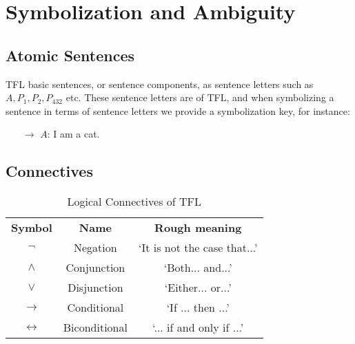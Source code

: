 %
%
%
\chapter{Symbolization and Ambiguity}
\label{Symb} %

\section{ Atomic Sentences}

\begin{definition}
    TFL  basic sentences, or sentence components, as sentence letters such as $A,P_1,P_2,P_{432}$ etc. These sentence letters are  of TFL, and when symbolizing a sentence in terms of sentence letters we provide a symbolization key, for instance:\begin{enumerate}
        \item[$\rightarrow$] $A$: I am a cat.
    \end{enumerate}
\end{definition}

\section{ Connectives}

\begin{table}[H]
    \centering
    \caption{Logical Connectives of TFL}
    \begin{tabular}{ccc}
        \textbf{Symbol} & \textbf{Name} & \textbf{Rough meaning} \\
        $\lnot$ & Negation & `It is not the case that...' \\
        $\wedge$ & Conjunction & `Both... and...'\\
        $\lor$ & Disjunction & `Either... or...' \\
        $\rightarrow$ & Conditional & `If ... then ...' \\
        $\leftrightarrow$ & Biconditional & `... if and only if ...'
    \end{tabular}
\end{table}



